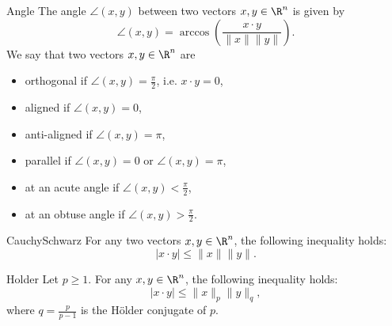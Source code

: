 \begin{theo}{Angle}
    The angle $\angle(x,y)$ between two vectors $x, y \in \R^n$ is given by
    \begin{equation*}
        \angle(x,y) = \arccos \left( \frac{x \cdot y}{\|x\| \|y\|} \right).
    \end{equation*}
    We say that two vectors $x, y \in \R^n$ are 
    \begin{itemize}
        \item orthogonal if $\angle(x,y) = \frac{\pi}{2}$, i\@.e\@. $x \cdot y = 0$,
        \item aligned if $\angle(x,y) = 0$,
        \item anti-aligned if $\angle(x,y) = \pi$,
        \item parallel if $\angle(x,y) = 0$ or $\angle(x,y) = \pi$,
        \item at an acute angle if $\angle(x,y) < \frac{\pi}{2}$,
        \item at an obtuse angle if $\angle(x,y) > \frac{\pi}{2}$.
    \end{itemize}
\end{theo}

\begin{theo}{CauchySchwarz}
    For any two vectors $x, y \in \R^n$, the following inequality holds:
    \begin{equation*}
        |x \cdot y| \leq \|x\| \|y\|.
    \end{equation*}
    \vspace*{-0.5cm}
\end{theo}

\begin{theo}{Holder}
    Let $p \geq 1$. For any $x,y \in \R^n$, the following inequality holds:
    \begin{equation*}
        |x \cdot y| \leq \|x\|_p \|y\|_q,
    \end{equation*}
    where $q = \frac{p}{p-1}$ is the Hölder conjugate of $p$.
\end{theo}